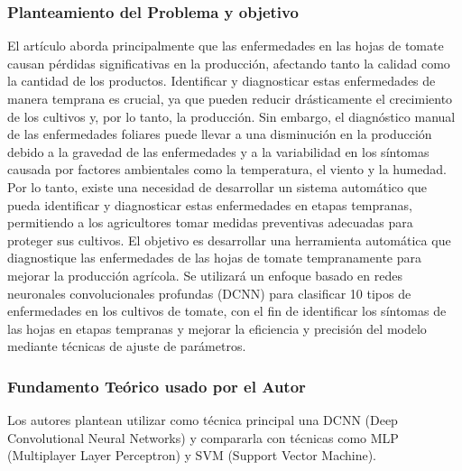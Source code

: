 \subsubsection{Planteamiento del Problema y objetivo }

El artículo aborda principalmente que las enfermedades en las hojas de tomate causan pérdidas significativas en la producción, afectando tanto la calidad como la cantidad de los productos. Identificar y diagnosticar estas enfermedades de manera temprana es crucial, ya que pueden reducir drásticamente el crecimiento de los cultivos y, por lo tanto, la producción. Sin embargo, el diagnóstico manual de las enfermedades foliares puede llevar a una disminución en la producción debido a la gravedad de las enfermedades y a la variabilidad en los síntomas causada por factores ambientales como la temperatura, el viento y la humedad. Por lo tanto, existe una necesidad de desarrollar un sistema automático que pueda identificar y diagnosticar estas enfermedades en etapas tempranas, permitiendo a los agricultores tomar medidas preventivas adecuadas para proteger sus cultivos. El objetivo es desarrollar una herramienta automática que diagnostique las enfermedades de las hojas de tomate tempranamente para mejorar la producción agrícola. Se utilizará un enfoque basado en redes neuronales convolucionales profundas (DCNN) para clasificar 10 tipos de enfermedades en los cultivos de tomate, con el fin de identificar los síntomas de las hojas en etapas tempranas y mejorar la eficiencia y precisión del modelo mediante técnicas de ajuste de parámetros.

\subsubsection{Fundamento Teórico usado por el Autor}

Los autores plantean utilizar como técnica principal una DCNN (Deep Convolutional Neural Networks) y compararla con técnicas como MLP (Multiplayer Layer Perceptron) y SVM (Support Vector Machine).

